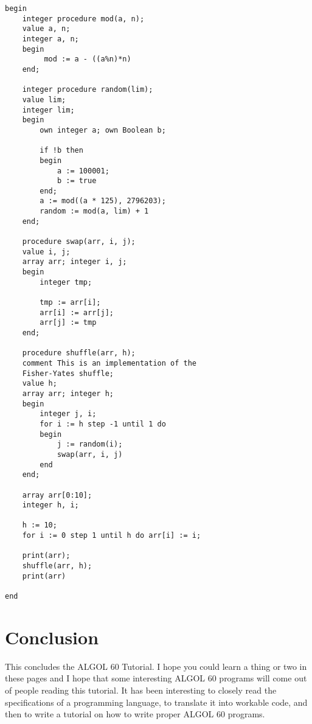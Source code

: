 \documentclass{article}
\begin{document}
\begin{lstlisting}[language={[60]algol}]
begin
    integer procedure mod(a, n);
    value a, n;
    integer a, n;
    begin
         mod := a - ((a%n)*n)
    end;
 
    integer procedure random(lim);
    value lim;
    integer lim;
    begin
        own integer a; own Boolean b;
        
        if !b then
        begin
            a := 100001;
            b := true
        end;
        a := mod((a * 125), 2796203);
        random := mod(a, lim) + 1
    end;

    procedure swap(arr, i, j);
    value i, j;
    array arr; integer i, j;
    begin
        integer tmp;

        tmp := arr[i];
        arr[i] := arr[j];
        arr[j] := tmp
    end;

    procedure shuffle(arr, h);
    comment This is an implementation of the 
    Fisher-Yates shuffle;
    value h;
    array arr; integer h;
    begin
        integer j, i;
        for i := h step -1 until 1 do
        begin
            j := random(i);
            swap(arr, i, j)
        end
    end;

    array arr[0:10];
    integer h, i;

    h := 10;
    for i := 0 step 1 until h do arr[i] := i;

    print(arr);
    shuffle(arr, h);
    print(arr)

end
\end{lstlisting}

\section{Conclusion}
This concludes the ALGOL 60 Tutorial. I hope you could learn a thing or two in these pages and I hope that some interesting ALGOL 60 programs will come out of people reading this tutorial. It has been interesting to closely read the specifications of a programming language, to translate it into workable code, and then to write a tutorial on how to write proper ALGOL 60 programs.
\end{document}
